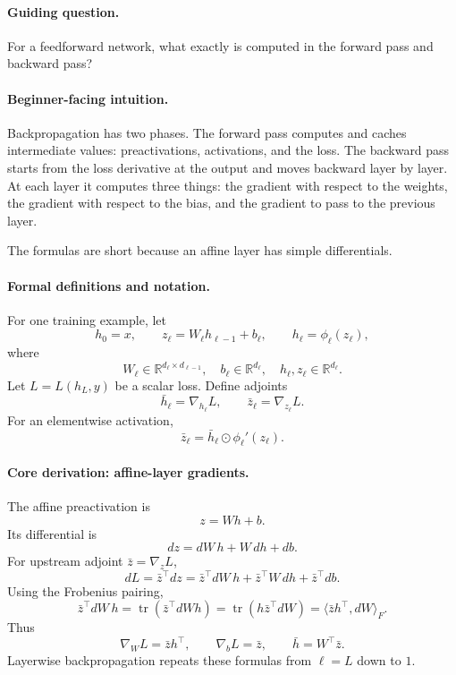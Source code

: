\paragraph{Guiding question.}
For a feedforward network, what exactly is computed in the forward pass and backward pass?

\paragraph{Beginner-facing intuition.}
Backpropagation has two phases. The forward pass computes and caches intermediate values: preactivations, activations, and the loss. The backward pass starts from the loss derivative at the output and moves backward layer by layer. At each layer it computes three things: the gradient with respect to the weights, the gradient with respect to the bias, and the gradient to pass to the previous layer.

The formulas are short because an affine layer has simple differentials.

\paragraph{Formal definitions and notation.}
For one training example, let
\[
h_0=x,
\qquad
z_\ell=W_\ell h_{\ell-1}+b_\ell,
\qquad
h_\ell=\phi_\ell(z_\ell),
\]
where
\[
W_\ell\in\mathbb R^{d_\ell\times d_{\ell-1}},
\quad
b_\ell\in\mathbb R^{d_\ell},
\quad
h_\ell,z_\ell\in\mathbb R^{d_\ell}.
\]
Let \(L=L(h_L,y)\) be a scalar loss. Define adjoints
\[
\bar h_\ell=\nabla_{h_\ell}L,\qquad
\bar z_\ell=\nabla_{z_\ell}L.
\]
For an elementwise activation,
\[
\boxed{
\bar z_\ell=\bar h_\ell\odot \phi_\ell'(z_\ell).
}
\]

\paragraph{Core derivation: affine-layer gradients.}
The affine preactivation is
\[
z=Wh+b.
\]
Its differential is
\[
dz=dW\,h+W\,dh+db.
\]
For upstream adjoint \(\bar z=\nabla_zL\),
\[
dL=\bar z^\top dz
=\bar z^\top dW\,h+\bar z^\top W\,dh+\bar z^\top db.
\]
Using the Frobenius pairing,
\[
\bar z^\top dW\,h
=\operatorname{tr}(\bar z^\top dW h)
=\operatorname{tr}(h\bar z^\top dW)
=\langle \bar z h^\top,dW\rangle_F.
\]
Thus
\[
\boxed{
\nabla_W L=\bar z h^\top,
\qquad
\nabla_b L=\bar z,
\qquad
\bar h=W^\top\bar z.
}
\]
Layerwise backpropagation repeats these formulas from \(\ell=L\) down to \(1\).

